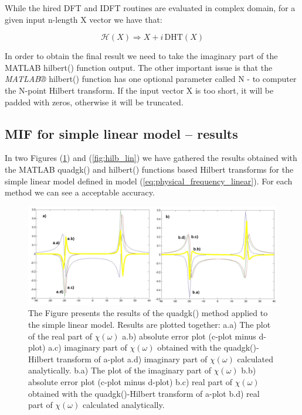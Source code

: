 \documentclass[12pt,twoside,a4paper]{article}
\numberwithin{equation}{subsection}
\numberwithin{figure}{subsection}
\begin{document}
While the hired DFT and IDFT routines are evaluated in complex domain, for a given input n-length X vector we have that:

\begin{equation} \label{eq:matlab_implication}
	\mathcal{H}(X) \Rightarrow X + i \, \mathrm{DHT}(X)
\end{equation}

In order to obtain the final result we need to take the imaginary part of the MATLAB hilbert() function output. The other important issue is that the \textit{MATLAB®} hilbert() function has one optional parameter called N - to computer the N-point Hilbert transform. If the input vector X is too short, it will be padded with zeros, otherwise it will be truncated. 

\subsection{MIF for simple linear model -- results} \label{chap:matlab_lin}

In two Figures (\ref{fig:quadgk_lin}) and (\ref{fig:hilb_lin}) we have ga\-thered the results ob\-tained with the MATLAB quadgk() and hilbert() functions based Hil\-bert trans\-forms for the simple linear model defined in model (\ref{eq:physical_frequency_linear}). For each method we can see a accep\-table accu\-racy.

\begin{figure} 
  \includegraphics[width=150mm]{img/quadgk_lin.png}
  \caption{The Figure presents the results of the quadgk() method applied to the simple linear model. Results are plotted together:
   a.a) The plot of the real part of $\chi (\omega )$ 
   a.b) absolute error plot (c-plot minus d-plot) 
   a.c) imaginary part of $\chi (\omega )$ obtained with the quadgk()-Hilbert transform of a-plot 
   a.d) imaginary part of $\chi (\omega )$  calculated analytically. 
   b.a) The plot of the imaginary part of $\chi (\omega )$ 
   b.b) absolute error plot (c-plot minus d-plot) 
   b.c) real part of $\chi (\omega )$ obtained with the quadgk()-Hilbert transform of a-plot 
   b.d) real part of $\chi (\omega )$ calculated analytically. \label{fig:quadgk_lin}
  }
\end{figure}
\end{document}

